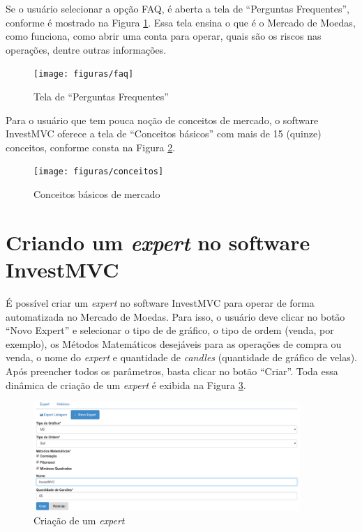 Se o usuário selecionar a opção FAQ, é aberta a tela de “Perguntas Frequentes”, conforme é mostrado na Figura \ref{faq}. Essa tela ensina o que é o Mercado de Moedas, como funciona, como abrir uma conta para operar, quais são os riscos nas operações, dentre outras informações. 

\begin{figure}[H]
\centering
\texttt{[image: figuras/faq]}
\caption{Tela de “Perguntas Frequentes”}
\label{faq}
\end{figure}

Para o usuário que tem pouca noção de conceitos de mercado, o software InvestMVC oferece a tela de “Conceitos básicos” com mais de 15 (quinze) conceitos, conforme consta na Figura \ref{conceitos}. 

\begin{figure}[H]
\centering
\texttt{[image: figuras/conceitos]}
\caption{Conceitos básicos de mercado}
\label{conceitos}
\end{figure}

\section{Criando um \textit{expert} no software InvestMVC}
É possível criar um \textit{expert} no software InvestMVC para operar de forma automatizada no Mercado de Moedas. Para isso, o usuário deve clicar no botão “Novo Expert” e selecionar o tipo de de gráfico, o tipo de ordem (venda, por exemplo), os Métodos Matemáticos desejáveis para as operações de compra ou venda, o nome do \textit{expert} e quantidade de \textit{candles} (quantidade de gráfico de velas). Após preencher todos os parâmetros, basta clicar no botão “Criar”. Toda essa dinâmica de criação de um \textit{expert} é exibida na Figura \ref{criarExpert}.

\begin{figure}[H]
\centering
\includegraphics[width=0.9\textwidth]{figuras/criarExpert}
\caption{Criação de um \textit{expert}}
\label{criarExpert}
\end{figure}


